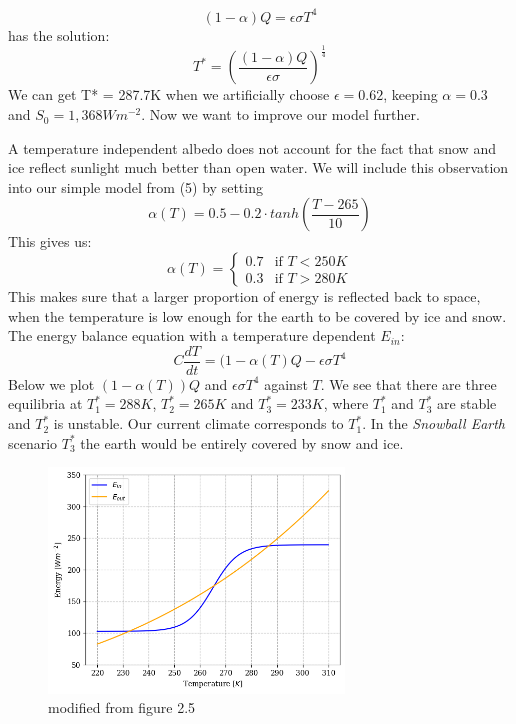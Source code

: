 \documentclass[%
thesis=student,%
coverpage=false,%
titlepage=false,%
headmarks=true, %
german,%
font=libertine, %
math=newpxtx, %
BCOR=5mm,%
coverBCOR=11mm%
]{tumbook}
\begin{document}
\begin{equation}
    (1-\alpha)Q = \epsilon \sigma T^4
\end{equation}
has the solution: 
\begin{equation}
    T^* = (\frac{(1-\alpha)Q}{\epsilon\sigma})^\frac{1}{4}
\end{equation}
We can get T* = 287.7K when we artificially choose $\epsilon = 0.62$, keeping $\alpha = 0.3$ and $S_{0} = 1,368 Wm^{-2}$. 
Now we want to improve our model further. 

A temperature independent albedo does not account for the fact that snow and ice reflect sunlight much better than open water. We will include this observation into our simple model from (5) by setting 
\begin{equation}
    \alpha (T) = 0.5 - 0.2 \cdot tanh(\frac{T - 265}{10})
\end{equation}
This gives us: 
\[
\alpha(T) =
\begin{cases}
0.7 & \text{if } T < 250K \\
0.3 & \text{if } T > 280K
\end{cases}
\]
This makes sure that a larger proportion of energy is reflected back to space, when the temperature is low enough for the earth to be covered by ice and snow.
The energy balance equation with a temperature dependent $E_{in}$: 
\[
 C\frac{dT}{dt} = (1-\alpha(T)Q - \epsilon\sigma T^4
\]
Below we plot $(1-\alpha(T))Q$ and $\epsilon\sigma T^4$ against $T$. We see that there are three equilibria at $T_{1}^* = 288K$, $T_{2}^* = 265K$ and $T_{3}^* = 233K$, where $T_{1}^*$ and $T_{3}^*$ are stable and $T_{2}^*$ is unstable. Our current climate corresponds to $T_{1}^*$. In the \textit{Snowball Earth} scenario $T_{3}^*$ the earth would be entirely covered by snow and ice. 

\begin{figure}
    \centering
    \includegraphics[width=0.7\textwidth]{bachelor-thesis/figures/se_multiple_equilibria.png}
    \caption{modified from \cite{Kaper:2013} figure 2.5}
    \label{fig:enter-label}
\end{figure}
\end{document}
